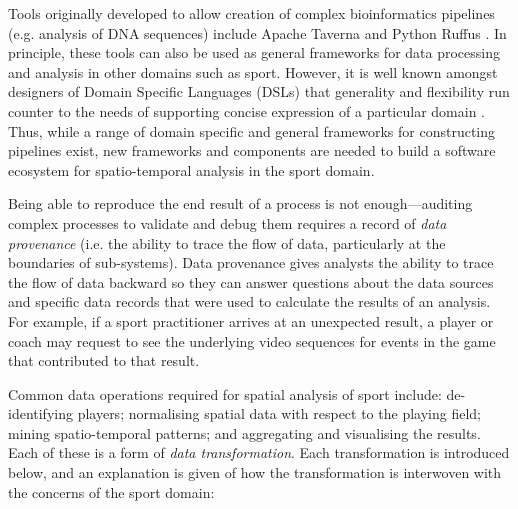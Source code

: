 Tools originally developed to allow creation of complex bioinformatics pipelines (e.g. analysis of DNA sequences) include Apache Taverna \cite{Oinn2004, Hull2006} and Python Ruffus \cite{Goodstadt2010}. In principle, these tools can also be used as general frameworks for data processing and analysis in other domains such as sport. However, it is well known amongst designers of Domain Specific Languages (DSLs) that generality and flexibility run counter to the needs of supporting concise expression of a particular domain \cite{Voelter2013}. Thus, while a range of domain specific and general frameworks for constructing pipelines exist, new frameworks and components are needed to build a software ecosystem for spatio-temporal analysis in the sport domain.

Being able to reproduce the end result of a process is not enough---auditing complex processes to validate and debug them requires a record of \textit{data provenance} (i.e. the ability to trace the flow of data, particularly at the boundaries of sub-systems). Data provenance gives analysts the ability to trace the flow of data backward so they can answer questions about the data sources and specific data records that were used to calculate the results of an analysis. For example, if a sport practitioner arrives at an unexpected result, a player or coach may request to see the underlying video sequences for events in the game that contributed to that result.



Common data operations required for spatial analysis of sport include: de-identifying players; normalising spatial data with respect to the playing field; mining spatio-temporal patterns; and aggregating and visualising the results. Each of these is a form of \textit{data transformation}. Each transformation is introduced below, and an explanation is given of how the transformation is interwoven with the concerns of the sport domain:

